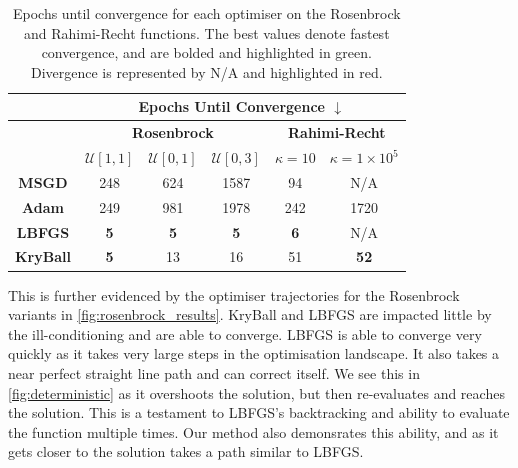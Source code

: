 \begin{table}[!t]
    \caption{Epochs until convergence for each optimiser on the Rosenbrock and Rahimi-Recht functions. The best values denote fastest convergence, and are bolded and highlighted in green. Divergence is represented by N/A and highlighted in red.}
    \label{tab:task_1_convergence_table}
    \begin{tabular}{cccccc}
    \hline
    \multicolumn{1}{l}{} & \multicolumn{5}{c}{\textbf{Epochs Until Convergence $\downarrow$}}                                                                                                                                   \\ \hline
                         & \multicolumn{3}{c}{\textbf{Rosenbrock}}                                                                      & \multicolumn{2}{c}{\textbf{Rahimi-Recht}}                                \\
                         & \textbf{$\mathcal{U}[1,1]$}                & \textbf{$\mathcal{U}[0,1]$}                & \textbf{$\mathcal{U}[0,3]$}                & \textbf{$\kappa = 10$}                      & \textbf{$\kappa = 1 \times 10^5$}                      \\ \hline
    \textbf{MSGD}        & 248                                & 624                                & 1587                               & \cellcolor[HTML]{FFFFFF}94         & \cellcolor[HTML]{FD6864}N/A         \\
    \textbf{Adam}        & 249                                & 981                                & 1978                               & 242                                & \cellcolor[HTML]{FFFFFF}1720        \\ \hline
    \textbf{LBFGS}       & \cellcolor[HTML]{34FF34}\textbf{5} & \cellcolor[HTML]{34FF34}\textbf{5} & \cellcolor[HTML]{34FF34}\textbf{5} & \cellcolor[HTML]{34FF34}\textbf{6} & \cellcolor[HTML]{FD6864}N/A         \\
    \textbf{KryBall}     & \cellcolor[HTML]{34FF34}\textbf{5} & 13                                 & 16                                 & 51                                 & \cellcolor[HTML]{34FF34}\textbf{52} \\ \hline
    \end{tabular}
\end{table}

This is further evidenced by the optimiser trajectories for the Rosenbrock variants in \cref{fig:rosenbrock_results}. KryBall and LBFGS are impacted little by the ill-conditioning and are able to converge. LBFGS is able to converge very quickly as it takes very large steps in the optimisation landscape. It also takes a near perfect straight line path and can correct itself. We see this in \cref{fig:deterministic} as it overshoots the solution, but then re-evaluates and reaches the solution. This is a testament to LBFGS's backtracking and ability to evaluate the function multiple times. Our method also demonsrates this ability, and as it gets closer to the solution takes a path similar to LBFGS.

